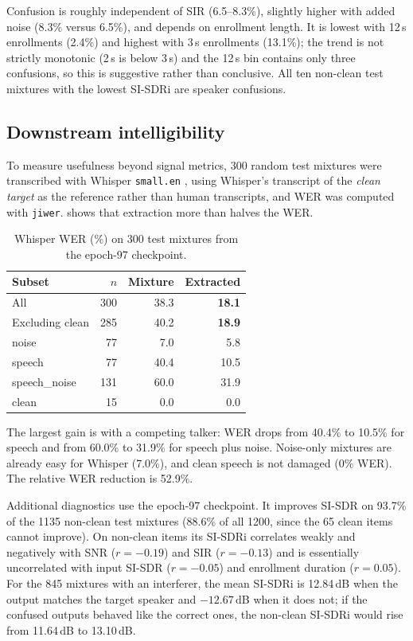 \documentclass[11pt,a4paper]{article}
\newcommand{\sisdr}{SI-SDR}
\newcommand{\sisdri}{SI-SDRi}
\begin{document}
Confusion is roughly independent of SIR (6.5--8.3\%), slightly higher with added noise (8.3\%
versus 6.5\%), and depends on enrollment length. It is lowest with 12\,s enrollments (2.4\%) and
highest with 3\,s enrollments (13.1\%); the trend is not strictly monotonic (2\,s is below 3\,s)
and the 12\,s bin contains only three confusions, so this is suggestive rather than conclusive.
All ten non-clean test mixtures with the lowest \sisdri{} are speaker confusions.

\subsection{Downstream intelligibility}
\label{sec:wer}
To measure usefulness beyond signal metrics, 300 random test mixtures were transcribed with
Whisper \texttt{small.en} \cite{radford2023whisper}, using Whisper's transcript of the \emph{clean
target} as the reference rather than human transcripts, and WER was computed with
\texttt{jiwer}.  shows that extraction more than halves the WER.

\begin{table}[htbp]
\centering\small
\caption{Whisper WER (\%) on 300 test mixtures from the epoch-97 checkpoint.}
\label{tab:wer}
\begin{tabular}{@{}lrrr@{}}
\toprule
Subset & $n$ & Mixture & Extracted\\
\midrule
All & 300 & 38.3 & \textbf{18.1}\\
Excluding clean & 285 & 40.2 & \textbf{18.9}\\
\midrule
noise & 77 & 7.0 & 5.8\\
speech & 77 & 40.4 & 10.5\\
speech\_noise & 131 & 60.0 & 31.9\\
clean & 15 & 0.0 & 0.0\\
\bottomrule
\end{tabular}
\end{table}

The largest gain is with a competing talker: WER drops from 40.4\% to 10.5\% for speech and from
60.0\% to 31.9\% for speech plus noise. Noise-only mixtures are already easy for Whisper (7.0\%),
and clean speech is not damaged (0\% WER). The relative WER reduction is 52.9\%.

Additional diagnostics use the epoch-97 checkpoint. It improves \sisdr{} on 93.7\% of the 1135
non-clean test mixtures (88.6\% of all 1200, since the 65 clean items cannot improve). On
non-clean items its \sisdri{} correlates weakly and negatively with SNR ($r=-0.19$) and SIR
($r=-0.13$) and is essentially uncorrelated with input \sisdr{} ($r=-0.05$) and enrollment
duration ($r=0.05$). For the 845 mixtures with an interferer, the mean \sisdri{} is 12.84\,dB when
the output matches the target speaker and $-12.67$\,dB when it does not; if the confused outputs
behaved like the correct ones, the non-clean \sisdri{} would rise from 11.64\,dB to 13.10\,dB.
\end{document}
